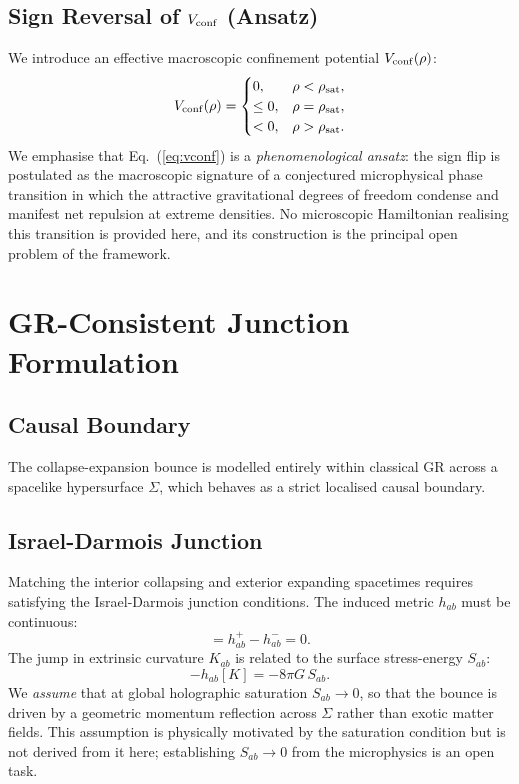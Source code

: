 \documentclass[reprint,superscriptaddress,amsmath,amssymb,aps,prd,showkeys,nofootinbib]{revtex4-2}
\begin{document}
\subsection{Sign Reversal of $V_{\rm conf}$ (Ansatz)}
We introduce an effective macroscopic confinement potential $V_{\rm conf}(\rho)$:
\begin{equation}
V_{\rm conf}(\rho) =
\begin{cases}
0, & \rho < \rho_{\rm sat},\\
\leq 0, & \rho = \rho_{\rm sat},\\
< 0, & \rho > \rho_{\rm sat}.
\end{cases}
\label{eq:vconf}
\end{equation}
We emphasise that Eq.~(\ref{eq:vconf}) is a \emph{phenomenological ansatz}: the sign flip
is postulated as the macroscopic signature of a conjectured microphysical phase transition
in which the attractive gravitational degrees of freedom condense and manifest net
repulsion at extreme densities. No microscopic Hamiltonian realising this transition is
provided here, and its construction is the principal open problem of the framework.

\section{GR-Consistent Junction Formulation}

\subsection{Causal Boundary}
The collapse-expansion bounce is modelled entirely within classical GR across a spacelike
hypersurface $\Sigma$, which behaves as a strict localised causal boundary.

\subsection{Israel-Darmois Junction}
Matching the interior collapsing and exterior expanding spacetimes requires satisfying the
Israel-Darmois junction conditions. The induced metric $h_{ab}$ must be continuous:
\begin{equation}
[h_{ab}] = h_{ab}^+ - h_{ab}^- = 0.
\end{equation}
The jump in extrinsic curvature $K_{ab}$ is related to the surface stress-energy $S_{ab}$:
\begin{equation}
[K_{ab}] - h_{ab}[K] = -8\pi G\,S_{ab}.
\end{equation}
We \emph{assume} that at global holographic saturation $S_{ab}\to0$, so that the bounce is
driven by a geometric momentum reflection across $\Sigma$ rather than exotic matter fields.
This assumption is physically motivated by the saturation condition but is not derived
from it here; establishing $S_{ab}\to0$ from the microphysics is an open task.
\end{document}
